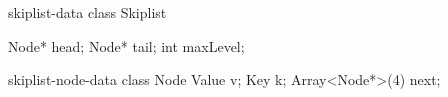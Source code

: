 \newcommand{\LocateGhostFig}{
\begin{minipage}[c]{4.2cm}
	\LocateGhostBody
\label{fig:locate:ghost}
\end{minipage}
}


%
%
\newcommand{\AddGhostBody}{
	\begin{algorithmic}[1]
		\State $\prev, \curr := \locate(e)$
		\If {$\curr.\val \neq e$}
			\State $\aux := \New \Node(e)$
			\State $\aux.\tNext := \curr$
			\State $\prev.\tNext := \aux$
			\Statex $\hs{0.7}\fbox{
				\begin{array}{l}
					l.r := l.r \cup \sreg{\aux} \\
				\end{array}}$
			\State $\result := \true$
		\Else
			\State $\result := \false$
		\EndIf
		\State $\prev.\unlock()$
		\State $\curr.\unlock()$
		\State \tbf{return} $\result$
	\end{algorithmic}
}


\newcommand{\AddGhostFig}{
\begin{minipage}[c]{4.2cm}
	\AddGhostBody
	\label{fig:add:ghost}
\end{minipage}
}


%
%
\newcommand{\RemoveGhostBody}{
		\begin{algorithmic}[1]
			\State $\prev, \curr := \locate(e)$
			\If {$\curr.\val = e$}
				\State $\aux := \curr.\tNext$
				\State $\prev.\tNext := \aux$
				\Statex $\hs{0.7}\fbox{
					\begin{array}{l}
						l.r := l.r - \sreg{\curr} \\
					\end{array}}$
				\State $\result := \true$
			\Else
				\State $\result := \false$
			\EndIf
			\State $\prev.\unlock()$
			\State $\curr.\unlock()$
			\State \tbf{return} $\result$
			\Statex
		\end{algorithmic}
}


\newcommand{\RemoveGhostFig}{
	\begin{minipage}[c]{4.3cm}
		\RemoveGhostBody
		\label{fig:remove:ghost}
  \end{minipage}
}



\begin{SaveVerbatim}{skiplist-data}
class Skiplist {
	Node* head;
	Node* tail;
	int maxLevel;

}
\end{SaveVerbatim}

\begin{SaveVerbatim}{skiplist-node-data}
class Node {
	Value v;
	Key k;
	Array<Node*>(4) next;
}
\end{SaveVerbatim}

